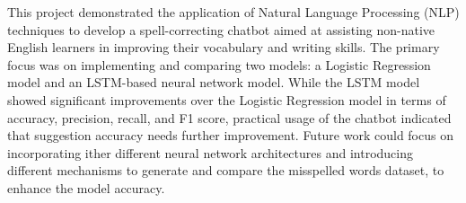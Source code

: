 This project demonstrated the application of Natural Language Processing (NLP) techniques to develop a spell-correcting chatbot aimed at assisting non-native English learners in improving their vocabulary and writing skills. The primary focus was on implementing and comparing two models: a Logistic Regression model and an LSTM-based neural network model. While the LSTM model showed significant improvements over the Logistic Regression model in terms of accuracy, precision, recall, and F1 score, practical usage of the chatbot indicated that suggestion accuracy needs further improvement. Future work could focus on incorporating ither different neural network architectures and introducing different mechanisms to generate and compare the misspelled words dataset, to enhance the model accuracy.
